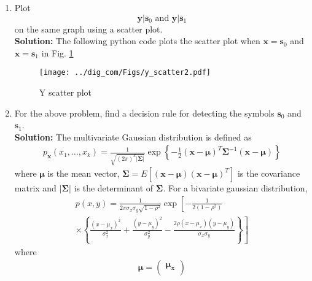 \documentclass{article}
\numberwithin{equation}{subsection}
\numberwithin{figure}{subsection}
\providecommand{\mbf}{\mathbf}
\providecommand{\cbrak}[1]{\ensuremath{\left\{#1\right\}}}
\providecommand{\brak}[1]{\ensuremath{\left(#1\right)}}
\providecommand{\lsbrak}[1]{\ensuremath{{}\left[#1\right.}}
\providecommand{\rsbrak}[1]{\ensuremath{{}\left.#1\right]}}
\providecommand{\sbrak}[1]{\ensuremath{{}\left[#1\right]}}
\providecommand{\abs}[1]{\left\vert#1\right\vert}
\newcommand{\solution}{\noindent \textbf{Solution: }}
\renewcommand\thesection{\arabic{section}}
\renewcommand\thesubsection{\thesection.\arabic{subsection}}
\begin{document}
\begin{enumerate}[label=\thesubsection.\arabic*,ref=\thesubsection.\arabic{figure}]
\item
\label{ch5_fsk}
Plot 
%
\begin{equation}
\mbf{y}|\mbf{s}_0 \text{ and } \mbf{y}|\mbf{s}_1
\end{equation}
%
on the same graph using a scatter plot.\\
\solution The following python code plots the scatter plot when $\mbf{x} = \mbf{s}_0$ and $\mbf{x} = \mbf{s}_1$ in Fig. \ref{fig:scatter_2}
\begin{center}
\end{center}
\begin{figure}
\centering
\texttt{[image: ../dig\_com/Figs/y\_scatter2.pdf]}     
\caption{Y scatter plot }
\label{fig:scatter_2}
\end{figure}
\item
For the above problem, find a decision rule for detecting the symbols $\mbf{s}_0 $ and $\mbf{s}_1$.\\
\solution The multivariate Gaussian distribution is defined as
    \begin{multline}
    \label{eq:multivariate}
    p_{\mathbf{x}}(x_1,\dots,x_k)
    =\frac{1}{\sqrt{\brak{2\pi}^k\abs{\mbf{\Sigma}}}}\exp\cbrak{-\frac{1}{2}\brak{\mathbf{x}-\mbf{\mu}}^T\mbf{\Sigma}^{-1}\brak{\mathbf{x}-\mbf{\mu}}}
    \end{multline}
    where $\mbf{\mu}$ is the mean vector, $\mbf{\Sigma} = E\sbrak{\brak{\mathbf{x}-\mbf{\mu}}\brak{\mathbf{x}-\mbf{\mu}}^T}$ is the covariance matrix and $\abs{\mbf{\Sigma}}$ is the determinant of $\mbf{\Sigma}$.
    For a bivariate gaussian distribution,
    {\small
    \begin{multline}
    \label{eq:bivariate}
    p(x,y)= \frac{1}{2\pi \sigma_x\sigma_y\sqrt{1-\rho^2}}\exp\lsbrak{-\frac{1}{2\brak{1-\rho^2}}}
    \\
    \times \rsbrak{\cbrak{\frac{\brak{x-\mu_x}^2}{\sigma_x^2}+\frac{\brak{y-\mu_y}^2}{\sigma_y^2}-\frac{2\rho\brak{x-\mu_x}\brak{y-\mu_y}}{\sigma_x\sigma_y}}}
    \end{multline}
    }
    where
    \begin{align}
\mbf{\mu}=\begin{pmatrix}
\mbf{\mu_x} \\

\end{pmatrix}
\end{align}
\end{enumerate}
\end{document}

